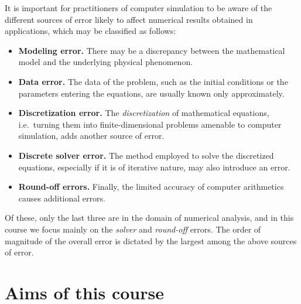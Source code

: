 It is important for practitioners of computer simulation to be aware of the different sources of error likely to affect numerical results obtained in applications,
which may be classified as follows:
\begin{itemize}
    \item
        \textbf{Modeling error.}
        There may be a discrepancy between the mathematical model and the underlying physical phenomenon.

    \item
        \textbf{Data error.}
        The data of the problem,
        such as the initial conditions or the parameters entering the equations,
        are usually known only approximately.

    \item
        \textbf{Discretization error.}
        The \emph{discretization} of mathematical equations,
        i.e.\ turning them into finite-dimensional problems amenable to computer simulation,
        adds another source of error.

    \item
        \textbf{Discrete solver error.}
        The method employed to solve the discretized equations,
        especially if it is of iterative nature,
        may also introduce an error.

    \item
        \textbf{Round-off errors.}
        Finally, the limited accuracy of computer arithmetics causes additional errors.
\end{itemize}
Of these,
only the last three are in the domain of numerical analysis,
and in this course we focus mainly on the \emph{solver} and \emph{round-off} errors.
The order of magnitude of the overall error is dictated by the largest among the above sources of error.

\section*{Aims of this course}%
\label{sec:aims_of_this_course}

